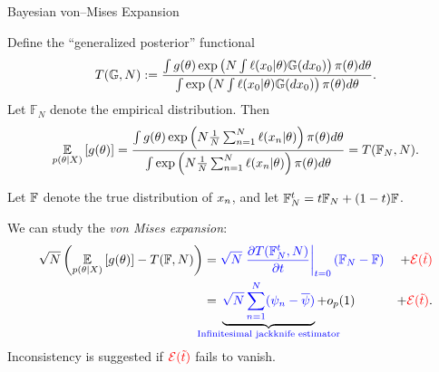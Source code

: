\def\gdist{\mathbb{G}}
\def\fndist{\mathbb{F}_N}
\def\ftdist{\mathbb{F}_N^{\t}}
\def\fwdist{\mathbb{F}_{N}^{w}}
\def\T{T}   %
\def\Tlin{T_{\mathrm{lin}}} %
\def\t{t}   %
\def\g{g}   %
\def\xn{\x_{0}}   %
\def\prior{\pi}
\def\ttil{\tilde{\t}}   %



\begin{frame}[t]{Bayesian von--Mises Expansion}


\pause

Define the ``generalized posterior'' functional
%
\begin{align*}
    \T(\gdist, N) := \frac{
        \int \g(\theta) \exp\left( N \int \ell(\xn \vert \theta) \gdist(d\xn)\right)
            \prior(\theta) d\theta
    }
    {
    \int \exp\left( N \int \ell(\xn \vert \theta) \gdist(d\xn)\right)
        \prior(\theta) d\theta
    }.
\end{align*}
%
Let $\fndist$ denote the empirical distribution.  Then
%
\begin{align*}
    \expect{\post}{\g(\theta)} =
    \frac{
        \int \g(\theta) \exp\left( N \meann \ell(\x_n \vert \theta) \right)
            \prior(\theta) d\theta
    }
    {
    \int \exp\left( N \meann \ell(\x_n \vert \theta) \right)
        \prior(\theta) d\theta
    } = \T(\fndist, N).
\end{align*}
%
\pause

Let $\mathbb{F}$ denote the true distribution of $x_n$, and
let $\ftdist  = \t \fndist + (1 - \t) \fdist$. 

We can study the \textit{von Mises expansion}:
%
\begin{align*}
    \sqrt{N} \left(\expect{\post}{\g(\theta)} - \T(\fdist, N) \right) ={}&
        \blue{\sqrt{N} \fracat{\partial \T(\ftdist, N)}{\partial \t}{\t = 0} (\fndist - \fdist)}
        & + \red{\err(\ttil)}
\\={}&
\undernote{
    \blue{\sqrt{N} \sumn (\infl_n - \overline{\infl})} }
    {\textrm{\blue{Infinitesimal jackknife estimator}}} + o_p(1) 
    & + \red{\err(\ttil)}.
\end{align*}
%
Inconsistency is suggested if $\red{\err(\ttil)}$ fails to vanish.
%
\end{frame}










